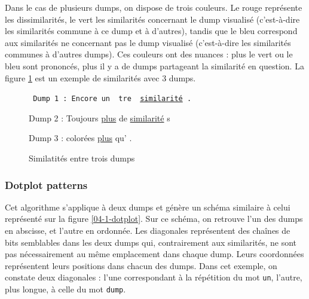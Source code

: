 Dans le cas de plusieurs dumps, on dispose de trois couleurs. Le rouge représente les dissimilarités, le vert les similarités concernant le dump visualisé (c'est-à-dire les similarités commune à ce dump et à d'autres), tandis que le bleu correspond aux similarités ne concernant pas le dump visualisé (c'est-à-dire les similarités communes à d'autres dumps).
Ces couleurs ont des nuances : plus le vert ou le bleu sont prononcés, plus il y a de dumps partageant la similarité en question. La figure \ref{04-1-sim_mult} est un exemple de similarités avec 3 dumps.

\begin{figure}[!h]
  \begin{center}
\small{
  {\tt
  {Dump 1 : \color{dissimColor} Encore un}{\color{otherSimColor} }{\color{dissimColor} tre }{\color{simColor} \uline{similarité}}{\color{dissimColor} .}

  {Dump 2 : \color{dissimColor} Toujours }{\color{simColor} \uline{plus} }{\color{dissimColor} de }{\color{simColor} \uline{similarité}}{\color{dissimColor} s}

  {Dump 3 : \color{dissimColor} colorées }{\color{simColor} \uline{plus} }{\color{dissimColor} qu'}{\color{otherSimColor} }{\color{dissimColor} .}
  }}
  \end{center}
  \caption{Similatités entre trois dumps}
  \label{04-1-sim_mult}
\end{figure}

\subsubsection{Dotplot patterns \cite {ref-dotplot}} \label{04-dotplot}

Cet algorithme s'applique à deux dumps et génère un schéma similaire à celui représenté sur la figure \ref{04-1-dotplot}.
Sur ce schéma, on retrouve l'un des dumps en abscisse, et l'autre en ordonnée. Les diagonales représentent des chaînes de bits semblables dans les deux dumps qui, contrairement aux similarités, ne sont pas nécessairement au même emplacement dans chaque dump. Leurs coordonnées représentent leurs positions dans chacun des dumps.
Dans cet exemple, on constate deux diagonales : l'une correspondant à la répétition du mot \texttt{un}, l'autre, plus longue, à celle du mot \texttt{dump}.

